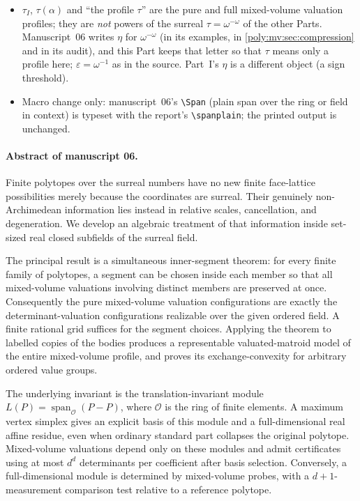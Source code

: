 \documentclass[11pt,a4paper]{article}
\numberwithin{equation}{section}
\theoremstyle{plain}
\newcommand{\R}{\mathbb R}
\newcommand{\eps}{\varepsilon}
\newcommand{\Span}{\operatorname{span}_{\R}}%
\newcommand{\OO}{\mathcal O}
\newcommand{\spanplain}{\operatorname{span}}%
\begin{document}
\begin{itemize}
  Hahn monomial there (Part~II's $t$ is a power-series variable evaluated at $t=\omega^{-1}$).
\item $\tau_I$, $\tau(\alpha)$ and ``the profile $\tau$'' are the pure and full
  mixed-volume valuation profiles; they are \emph{not} powers of the surreal
  $\tau=\omega^{-\omega}$ of the other Parts. Manuscript~06 writes $\eta$
  for $\omega^{-\omega}$ (in its examples, in \cref{poly:mv:sec:compression}
  and in its audit), and this Part keeps that letter so that $\tau$ means only
  a profile here; $\eps=\omega^{-1}$ as in the source. Part~I's $\eta$ is a
  different object (a sign threshold).
\item Macro change only: manuscript~06's \verb|\Span| (plain span over the ring
  or field in context) is typeset with the report's \verb|\spanplain|; the
  printed output is unchanged.
\end{itemize}

\paragraph{Abstract of manuscript 06.}
Finite polytopes over the surreal numbers have no new finite face-lattice
possibilities merely because the coordinates are surreal. Their genuinely
non-Archimedean information lies instead in relative scales, cancellation,
and degeneration. We develop an algebraic treatment of that information
inside set-sized real closed subfields of the surreal field.

The principal result is a simultaneous inner-segment theorem: for every
finite family of polytopes, a segment can be chosen inside each member so
that all mixed-volume valuations involving distinct members are preserved
at once. Consequently the pure mixed-volume valuation configurations are
exactly the determinant-valuation configurations realizable over the given
ordered field. A finite rational grid suffices for the segment choices.
Applying the theorem to labelled copies of the bodies produces a
representable valuated-matroid model of the entire mixed-volume profile,
and proves its exchange-convexity for arbitrary ordered value groups.

The underlying invariant is the translation-invariant module
$L(P)=\spanplain_{\OO}(P-P)$, where $\OO$ is the ring of finite elements.
A maximum vertex simplex gives an explicit basis of this module and a
full-dimensional real affine residue, even when ordinary standard part
collapses the original polytope. Mixed-volume valuations depend only on
these modules and admit certificates using at most $d^d$ determinants per
coefficient after basis selection. Conversely, a full-dimensional module
is determined by mixed-volume probes, with a $d+1$-measurement comparison
test relative to a reference polytope.
\end{document}
